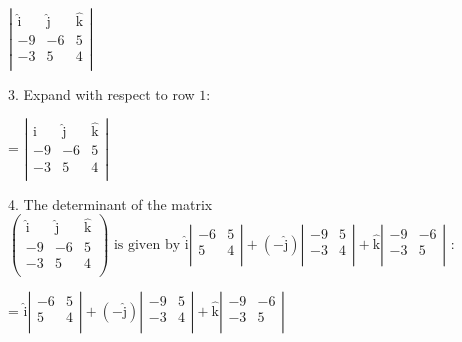 \documentclass{article}
\begin{document}
$\left| 
\begin{array}{ccc}
\hat{\text{i}} & \hat{\text{j}} & \hat{\text{k}} \\
 -9 & -6 & 5 \\
 -3 & 5 & 4 \\
\end{array}
\right|$

3. Expand with respect to row $1:$

= $\left| 
\begin{array}{ccc}
\hat{\text{i}} & \hat{\text{j}} & \hat{\text{k}} \\
 -9 & -6 & 5 \\
 -3 & 5 & 4 \\
\end{array}
\right|$

4. The determinant of the matrix $\left(
\begin{array}{ccc}
\hat{\text{i}} & \hat{\text{j}} & \hat{\text{k}} \\
 -9 & -6 & 5 \\
 -3 & 5 & 4 \\
\end{array}
\right)\text{ is given by }\hat{\text{i}} \left| 
\begin{array}{cc}
-6 & 5 \\
 5 & 4 \\
\end{array}
\right| +\left(-\hat{\text{j}}\right) \left| 
\begin{array}{cc}
-9 & 5 \\
 -3 & 4 \\
\end{array}
\right| +\hat{\text{k}} \left| 
\begin{array}{cc}
-9 & -6 \\
 -3 & 5 \\
\end{array}
\right|$ :

= $\hat{\text{i}} \left| 
\begin{array}{cc}
-6 & 5 \\
 5 & 4 \\
\end{array}
\right| +\left(-\hat{\text{j}}\right) \left| 
\begin{array}{cc}
-9 & 5 \\
 -3 & 4 \\
\end{array}
\right| +\hat{\text{k}} \left| 
\begin{array}{cc}
-9 & -6 \\
 -3 & 5 \\
\end{array}
\right|$
\end{document}
